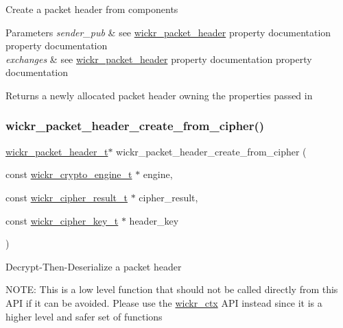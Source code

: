 Create a packet header from components


\begin{DoxyParams}{Parameters}
{\em sender\+\_\+pub} & see \textquotesingle{}\mbox{\hyperlink{structwickr__packet__header}{wickr\+\_\+packet\+\_\+header}}\textquotesingle{} property documentation property documentation \\
\hline
{\em exchanges} & see \textquotesingle{}\mbox{\hyperlink{structwickr__packet__header}{wickr\+\_\+packet\+\_\+header}}\textquotesingle{} property documentation property documentation \\
\hline
\end{DoxyParams}
\begin{DoxyReturn}{Returns}
a newly allocated packet header owning the properties passed in 
\end{DoxyReturn}
\mbox{\label{group__wickr__protocol_ga53ff33471ac0c4c7e3feedfcce520639}} 
\subsubsection{\texorpdfstring{wickr\+\_\+packet\+\_\+header\+\_\+create\+\_\+from\+\_\+cipher()}{wickr\_packet\_header\_create\_from\_cipher()}}
{\footnotesize\ttfamily \mbox{\hyperlink{structwickr__packet__header}{wickr\+\_\+packet\+\_\+header\+\_\+t}}$\ast$ wickr\+\_\+packet\+\_\+header\+\_\+create\+\_\+from\+\_\+cipher (\begin{DoxyParamCaption}\item[{const \mbox{\hyperlink{structwickr__crypto__engine}{wickr\+\_\+crypto\+\_\+engine\+\_\+t}} $\ast$}]{engine,  }\item[{const \mbox{\hyperlink{structwickr__cipher__result}{wickr\+\_\+cipher\+\_\+result\+\_\+t}} $\ast$}]{cipher\+\_\+result,  }\item[{const \mbox{\hyperlink{structwickr__cipher__key}{wickr\+\_\+cipher\+\_\+key\+\_\+t}} $\ast$}]{header\+\_\+key }\end{DoxyParamCaption})}

Decrypt-\/\+Then-\/\+Deserialize a packet header

N\+O\+TE\+: This is a low level function that should not be called directly from this A\+PI if it can be avoided. Please use the \textquotesingle{}\mbox{\hyperlink{structwickr__ctx}{wickr\+\_\+ctx}}\textquotesingle{} A\+PI instead since it is a higher level and safer set of functions


